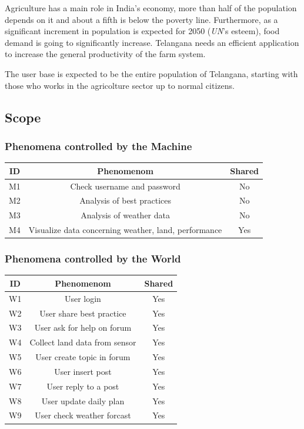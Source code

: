\documentclass[table, 12pt]{article}
\begin{document}
Agriculture has a main role in India's economy, more than half of the population depends on it and about a fifth is below the poverty line.
Furthermore, as a significant increment in population is expected for 2050 (\emph{UN}'s esteem), food demand is going to significantly increase.
Telangana needs an efficient application to increase the general productivity of the farm system.

The user base is expected to be the entire population of Telangana, starting with those who works in the agricolture sector up to normal citizens.

\subsection{Scope} %

\subsubsection*{Phenomena controlled by the Machine}
\begin{tabular}{|c|c|c|}
    \hline
    \textbf{ID} & \textbf{Phenomenom} & \textbf{Shared} \\\hline\hline
    M1 & Check username and password & No \\\hline
    M2 & Analysis of best practices & No\\\hline
    M3 & Analysis of weather data & No \\\hline
    M4 & Visualize data concerning weather, land, performance & Yes\\\hline
    \hline
\end{tabular}

\subsubsection*{Phenomena controlled by the World}
\begin{tabular}{|c|c|c|}
    \hline
    \textbf{ID} & \textbf{Phenomenom} & \textbf{Shared} \\\hline\hline
    W1 & User login & Yes\\\hline
    W2 & User share best practice & Yes\\\hline
    W3 & User ask for help on forum & Yes\\\hline
    W4 & Collect land data from sensor & Yes\\\hline
    W5 & User create topic in forum & Yes\\\hline 
    W6 & User insert post & Yes\\\hline
    W7 & User reply to a post & Yes \\\hline
    W8 & User update daily plan & Yes\\\hline
    W9 & User check weather forcast & Yes\\\hline
    \hline
\end{tabular}
\end{document}
